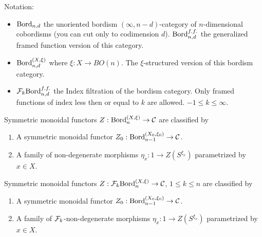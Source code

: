 \documentclass{amsart}
\begin{document}


Notation:
\begin{itemize}
	\item $\mathrm{Bord}_{n,d}$ the unoriented bordism $(\infty, n-d)$-category of $n$-dimensional cobordisms (you can cut only to codimension $d$). $\mathrm{Bord}_{n,d}^{f.f.}$ the generalized framed function version of this category. 
	\item $\mathrm{Bord}_{n,d}^{(X,\xi)}$ where $\xi:X \to BO(n)$. The $\xi$-structured version of this bordism category.
	\item $\mathcal F_k \mathrm{Bord}_{n,d}^{f.f.}$ the Index filtration of the bordism category. Only framed functions of index less then or equal to $k$ are allowed. $-1\leq k \leq \infty$.  
\end{itemize}



\begin{theorem}
	Symmetric monoidal functors $Z: \mathrm{Bord}^{(X,\xi)}_n \to \mathcal C$ are classified by 
	\begin{enumerate}
		\item A symmetric monoidal functor $Z_0: \mathrm{Bord}^{(X_0,\xi_0)}_{n-1} \to \mathcal C$.
		\item A family of non-degenerate morphisms $\eta_x: 1 \to Z(S^{\xi_x})$ parametrized by $x \in X$. 
	\end{enumerate}
\end{theorem}

\begin{theorem}[alternate]
	Symmetric monoidal functors $Z: \mathcal F_{k}\mathrm{Bord}^{(X,\xi)}_n \to \mathcal C$, $1 \leq k \leq n$ are classified by 
	\begin{enumerate}
		\item A symmetric monoidal functor $Z_0: \mathrm{Bord}^{(X_0,\xi_0)}_{n-1} \to \mathcal C$.
		\item A family of $\mathcal F_k$-non-degenerate morphisms $\eta_x: 1 \to Z(S^{\xi_x})$ parametrized by $x \in X$. 
	\end{enumerate}
\end{theorem}
\end{document}
